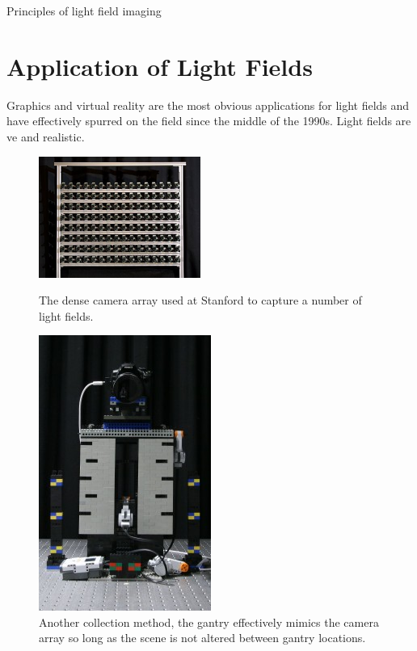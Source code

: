 \documentclass[12pt]{report}
\begin{document}
\cite{Ihrke16} Principles of light field imaging

\section{Application of Light Fields}
Graphics and virtual reality are the most obvious applications for light fields and have effectively spurred on the field since the middle of the 1990s. Light fields are ve and realistic.

\begin{figure}[!ht]
	\centering
	\begin{minipage}{0.45\textwidth}
		\centering
		\includegraphics[scale=0.9]{stanford_camera_array.png}
		\caption{The dense camera array used at Stanford to capture a number of light fields.}
		\label{fig:camera_array}
	\end{minipage}\hfill
	\begin{minipage}{0.45\textwidth}
		\centering
		\includegraphics[scale=0.5]{lego_gantry.jpg}
		\caption{Another collection method, the gantry effectively mimics the camera array so long as the scene is not altered between gantry locations.}
		\label{fig:lego_gantry}
	\end{minipage}
\end{figure}
\end{document}
